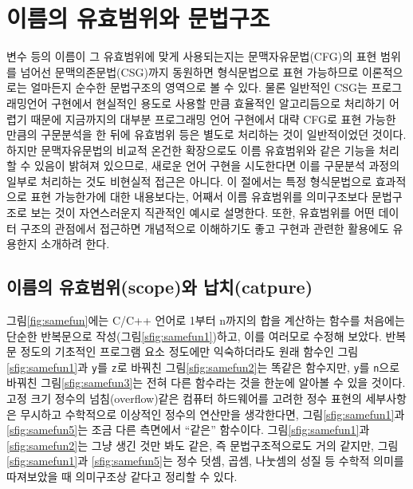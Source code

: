 \section{이름의 유효범위와 문법구조}
변수 등의 이름이 그 유효범위에 맞게 사용되는지는 문맥자유문법(CFG)의
표현 범위를 넘어선 문맥의존문법(CSG)까지 동원하면 형식문법으로 표현
가능하므로 이론적으로는 얼마든지 순수한 문법구조의 영역으로 볼 수 있다.
물론 일반적인 CSG는 프로그래밍언어 구현에서 현실적인 용도로 사용할 만큼
효율적인 알고리듬으로 처리하기 어렵기 때문에 지금까지의 대부분 프로그래밍
언어 구현에서 대략 CFG로 표현 가능한 만큼의 구문분석을 한 뒤에
유효범위 등은 별도로 처리하는 것이 일반적이었던 것이다. 하지만
문맥자유문법의 비교적 온건한 확장\cite{Okhotin2005existence}으로도
이름 유효범위와 같은 기능을 처리할 수 있음이 밝혀져 있으므로, 새로운
언어 구현을 시도한다면 이를 구문분석 과정의 일부로 처리하는 것도
비현실적 접근은 아니다. 이 절에서는 특정 형식문법으로 효과적으로
표현 가능한가에 대한 내용보다는, 어째서 이름 유효범위를 의미구조보다
문법구조로 보는 것이 자연스러운지 직관적인 예시로 설명한다. 또한,
유효범위를 어떤 데이터 구조의 관점에서 접근하면 개념적으로 이해하기도
좋고 구현과 관련한 활용에도 유용한지 소개하려 한다.

\subsection{이름의 유효범위(scope)와 납치(catpure)}
%
%
그림\;\ref{fig:samefun}에는 C/C++ 언어로 1부터 n까지의 합을 계산하는 함수를
처음에는 단순한 반복문으로 작성(그림\;\ref{sfig:samefun1})하고, 이를 여러모로
수정해 보았다. 반복문 정도의 기초적인 프로그램 요소 정도에만 익숙하더라도
원래 함수인 그림\;\ref{sfig:samefun1}과 \texttt{y}를 \texttt{z}로 바꿔친
그림\;\ref{sfig:samefun2}는 똑같은 함수지만, \texttt{y}를 \texttt{n}으로
바꿔친 그림\;\ref{sfig:samefun3}는 전혀 다른 함수라는 것을 한눈에 알아볼 수
있을 것이다. 고정 크기 정수의 넘침(overflow)같은 컴퓨터 하드웨어를 고려한 
정수 표현의 세부사항은 무시하고 수학적으로 이상적인 정수의 연산만을 생각한다면,
그림\;\ref{sfig:samefun1}과 \ref{sfig:samefun5}는 조금 다른 측면에서
``같은'' 함수이다. 그림\;\ref{sfig:samefun1}과 \ref{sfig:samefun2}는
그냥 생긴 것만 봐도 같은, 즉 문법구조적으로도 거의 같지만,
그림\;\ref{sfig:samefun1}과 \ref{sfig:samefun5}는 정수 덧셈, 곱셈, 나눗셈의
성질 등 수학적 의미를 따져보았을 때 의미구조상 같다고 정리할 수 있다.

